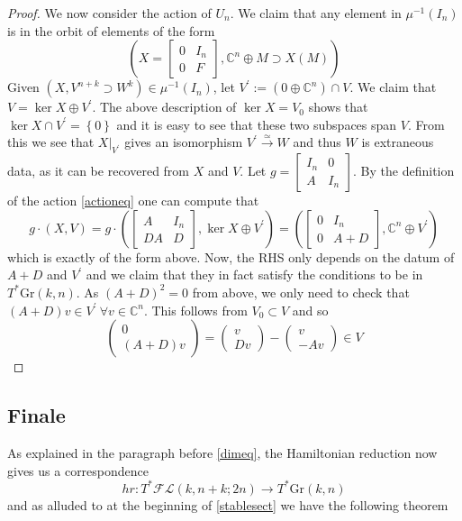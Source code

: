 \documentclass[12pt]{amsart}
\numberwithin{equation}{section}
\theoremstyle{definition}
\numberwithin{figure}{section}
\newcommand{\C}{\mathbb{C}}
\newcommand{\grass}[2]{\mathrm{Gr}(#1,#2)}
\newcommand{\fl}{\mathcal{FL}}
\newcommand{\set}[1]{\left\{ #1 \right\}}
\newcommand{\paren}[1]{\left( #1 \right)}
\begin{document}
\begin{proof}
We now consider the action of $U_n$. We claim that any element in 
$\mu^{-1}(I_n)$ is in the orbit of elements of the form
\[  \left( X=\begin{bmatrix}
0 & I_n \\
0 & F
\end{bmatrix} , \C^n\oplus M \supset X(M) \right) \]
Given $(X, V^{n+k}\supset W^k)\in \mu^{-1}(I_n)$, let $V^{\prime}:=(0\oplus \C^n)\cap V$. We claim that $ V=\ker X\oplus V^\prime $. The above description of $\ker X=V_0$ shows that $\ker X\cap V^\prime=\set{0}$ and it is easy to see that these two subspaces span $V$. From this we see that $X|_{V^\prime}$ gives an isomorphism $V^\prime\xrightarrow{\simeq}W$ and thus $W$ is extraneous data, as it can be recovered from $X$ and $V$. Let $g=\begin{bmatrix}
I_n & 0 \\
A & I_n
\end{bmatrix}$. By the definition of the action \cref{actioneq} one can compute that
\[ g\cdot(X, V)=g\cdot \paren{ \begin{bmatrix}
A & I_n\\
DA & D
\end{bmatrix} , \ker X\oplus V^\prime }=  \paren{ \begin{bmatrix}
0 & I_n\\
0 & A+D
\end{bmatrix} , \C^n\oplus V^\prime}\]
which is exactly of the form above. Now, the RHS only depends on the datum of $A+D$ and $V^\prime$ and we claim that they in fact satisfy the conditions to be in $T^*\grass{k}{n}$. As $(A+D)^2=0$ from above, we only need to check that $(A+D)v\in V^\prime\ \forall v\in \C^n$. This follows from $V_0\subset V$ and so 
\[ \begin{pmatrix}
0 \\
(A+D)v
\end{pmatrix}=\begin{pmatrix}
v \\
Dv
\end{pmatrix}-\begin{pmatrix}
v \\
-Av
\end{pmatrix}\in V \]
\end{proof}

\subsection{Finale}


As explained in the paragraph before \cref{dimeq}, the Hamiltonian reduction now gives us a correspondence
\[ hr:  T^*\fl(k,  n+k; 2n)\to  T^*\grass{k}{n}   \]
and as alluded to at the beginning of \cref{stablesect} we have the following theorem
\end{document}
